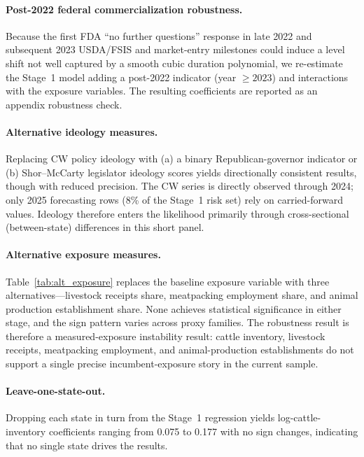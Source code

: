 \documentclass[12pt]{article}
\begin{document}
\paragraph{Post-2022 federal commercialization robustness.}  Because the first FDA ``no further questions'' response in late 2022 and subsequent 2023 USDA/FSIS and market-entry milestones could induce a level shift not well captured by a smooth cubic duration polynomial, we re-estimate the Stage~1 model adding a post-2022 indicator (year $\geq 2023$) and interactions with the exposure variables.  The resulting coefficients are reported as an appendix robustness check.

\paragraph{Alternative ideology measures.}  Replacing CW policy ideology with (a) a binary Republican-governor indicator or (b) Shor--McCarty legislator ideology scores \citep{shor2011ideological} yields directionally consistent results, though with reduced precision.  The CW series is directly observed through 2024; only 2025 forecasting rows (8\% of the Stage~1 risk set) rely on carried-forward values.  Ideology therefore enters the likelihood primarily through cross-sectional (between-state) differences in this short panel.

\paragraph{Alternative exposure measures.}  Table~\ref{tab:alt_exposure} replaces the baseline exposure variable with three alternatives---livestock receipts share, meatpacking employment share, and animal production establishment share.  None achieves statistical significance in either stage, and the sign pattern varies across proxy families.  The robustness result is therefore a measured-exposure instability result: cattle inventory, livestock receipts, meatpacking employment, and animal-production establishments do not support a single precise incumbent-exposure story in the current sample.

\paragraph{Leave-one-state-out.}  Dropping each state in turn from the Stage~1 regression yields log-cattle-inventory coefficients ranging from 0.075 to 0.177 with no sign changes, indicating that no single state drives the results.
\end{document}
